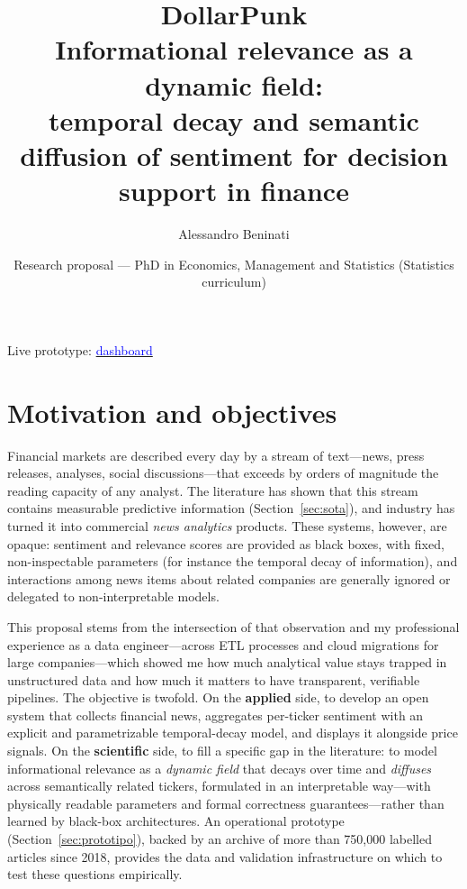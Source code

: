\documentclass[a4paper,11pt]{article}
\title{\vspace{-1.5em}\textbf{DollarPunk}\\[0.3em]
  {\large Informational relevance as a dynamic field:\\
  temporal decay and semantic diffusion of sentiment for decision support in finance}}
\author{Alessandro Beninati}
\date{Research proposal --- PhD in Economics, Management and Statistics (Statistics curriculum)}
\begin{document}
\maketitle
\vspace{-0.6em}
\begin{center}
\small Live prototype: \href{https://dollarpunk-26786f215068.herokuapp.com/dashboard}{\textcolor{blue}{dashboard}}
\end{center}
\vspace{-0.2em}

\section{Motivation and objectives}

Financial markets are described every day by a stream of text---news, press releases, analyses, social discussions---that exceeds by orders of magnitude the reading capacity of any analyst. The literature has shown that this stream contains measurable predictive information (Section~\ref{sec:sota}), and industry has turned it into commercial \textit{news analytics} products. These systems, however, are opaque: sentiment and relevance scores are provided as black boxes, with fixed, non-inspectable parameters (for instance the temporal decay of information), and interactions among news items about related companies are generally ignored or delegated to non-interpretable models.

This proposal stems from the intersection of that observation and my professional experience as a data engineer---across ETL processes and cloud migrations for large companies---which showed me how much analytical value stays trapped in unstructured data and how much it matters to have transparent, verifiable pipelines. The objective is twofold. On the \textbf{applied} side, to develop an open system that collects financial news, aggregates per-ticker sentiment with an explicit and parametrizable temporal-decay model, and displays it alongside price signals. On the \textbf{scientific} side, to fill a specific gap in the literature: to model informational relevance as a \emph{dynamic field} that decays over time and \emph{diffuses} across semantically related tickers, formulated in an interpretable way---with physically readable parameters and formal correctness guarantees---rather than learned by black-box architectures. An operational prototype (Section~\ref{sec:prototipo}), backed by an archive of more than 750{,}000 labelled articles since 2018, provides the data and validation infrastructure on which to test these questions empirically.
\end{document}
